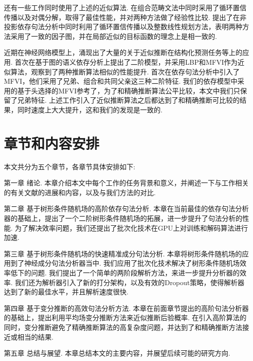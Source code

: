 还有一些工作同时使用了上述的近似算法.
\citet{auli-lopez-2011-comparison}在组合范畴文法中同时采用了循环置信传播\citep{smith-eisner-2008-dependency}以及对偶分解\citep{koo-etal-2010-dual}，取得了最佳性能，并对两种方法做了经验性比较.
\citet{martins-etal-2010-turbo}提出了在非投影依存句法分析中同时利用了循环置信传播\citep{smith-eisner-2008-dependency}以及整数线性规划\citep{martins-etal-2009-concise}方法，表明两种方法采用了一致的因子图，并在局部近似的目标函数的理念上是相一致的.

近期在神经网络模型上，涌现出了大量的关于近似推断在结构化预测任务等上的应用\citep{li-etal-2020-high,wang-etal-2020-ain}.
\citet{wang-etal-2019-second}首次在基于图的语义依存分析上提出了二阶模型，并采用LBP和MFVI作为近似算法，观察到了两种推断算法相似的性能提升.
\citet{wang-tu-2020-second}首次在依存句法分析中引入了MFVI，他们采用了兄弟、组合和共同父亲这三种二阶特征.
我们的依存模型中采用的基于头选择的MFVI参考了\citet{wang-tu-2020-second}，为了和精确推断算法公平比较，本文中我们只保留了兄弟特征.
上述工作引入了近似推断算法之后都达到了和精确推断可比较的结果，同时速度上大大提升，这和我们的发现是一致的.

\section{章节和内容安排}

本文共分为五个章节，各章节具体安排如下:

第一章 绪论. 本章介绍本文中每个工作的任务背景和意义，并阐述一下与工作相关的有关文献的进展和内容，以及与我们方法的对比.

第二章 基于树形条件随机场的高阶依存句法分析.
本章在当前最佳的依存句法分析器的基础上，提出了一个二阶树形条件随机场的拓展，进一步提升了句法分析的性能.
为了解决效率问题，我们还提出了批次化技术在GPU上对训练和解码算法进行加速.

第三章 基于树形条件随机场的快速精准成分句法分析.
本章将树形条件随机场的应用到了神经成分句法分析器当中.
我们应用了批次化技术解决了树形条件随机场效率低下的问题.
我们提出了一个简单的两阶段解析方法，来进一步提升分析器的效率.
我们还为解析器引入了新的打分架构，以及有效的Dropout策略，使得解析器达到了新的最佳水平，并且解析速度很快.

第四章 基于变分推断的高效句法分析方法.
本章在前面章节提出的高阶句法分析器的基础上，提出利用平均场变分推断方法来近似推断后验概率.
在引入高阶算法的同时，变分推断避免了精确推断算法的高复杂度问题，并达到了和精确推断方法接近或相当的结果.

第五章 总结与展望. 本章总结本文的主要内容，并展望后续可能的研究方向.